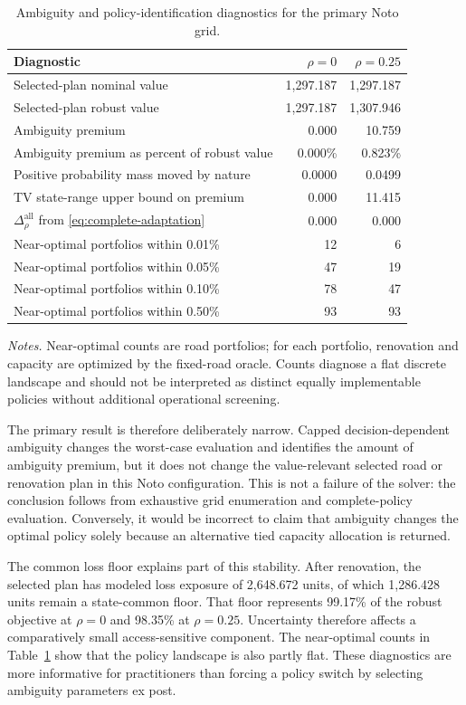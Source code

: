 \begin{table}[t]
\centering
\caption{Ambiguity and policy-identification diagnostics for the primary Noto grid.}
\label{tab:noto-ambiguity}
\small
\begin{tabular}{lrr}
\toprule
Diagnostic & \(\rho=0\) & \(\rho=0.25\)\\
\midrule
Selected-plan nominal value & 1{,}297.187 & 1{,}297.187\\
Selected-plan robust value & 1{,}297.187 & 1{,}307.946\\
Ambiguity premium & 0.000 & 10.759\\
Ambiguity premium as percent of robust value & 0.000\% & 0.823\%\\
Positive probability mass moved by nature & 0.0000 & 0.0499\\
TV state-range upper bound on premium & 0.000 & 11.415\\
\(\Delta_\rho^{\mathrm{all}}\) from \eqref{eq:complete-adaptation} & 0.000 & 0.000\\
Near-optimal portfolios within 0.01\% & 12 & 6\\
Near-optimal portfolios within 0.05\% & 47 & 19\\
Near-optimal portfolios within 0.10\% & 78 & 47\\
Near-optimal portfolios within 0.50\% & 93 & 93\\
\bottomrule
\end{tabular}
\par\smallskip
\footnotesize\textit{Notes.} Near-optimal counts are road portfolios;
for each portfolio, renovation and capacity are optimized by the fixed-road
oracle. Counts diagnose a flat discrete landscape and should not be
interpreted as distinct equally implementable policies without additional
operational screening.
\end{table}

The primary result is therefore deliberately narrow. Capped
decision-dependent ambiguity changes the worst-case evaluation and identifies
the amount of ambiguity premium, but it does not change the value-relevant
selected road or renovation plan in this Noto configuration. This is not a
failure of the solver: the conclusion follows from exhaustive grid
enumeration and complete-policy evaluation. Conversely, it would be
incorrect to claim that ambiguity changes the optimal policy solely because
an alternative tied capacity allocation is returned.

The common loss floor explains part of this stability. After renovation,
the selected plan has modeled loss exposure of 2,648.672 units, of which
1,286.428 units remain a state-common floor. That floor represents 99.17\%
of the robust objective at \(\rho=0\) and 98.35\% at \(\rho=0.25\).
Uncertainty therefore affects a comparatively small access-sensitive
component. The near-optimal counts in Table~\ref{tab:noto-ambiguity} show
that the policy landscape is also partly flat. These diagnostics are more
informative for practitioners than forcing a policy switch by selecting
ambiguity parameters ex post.

